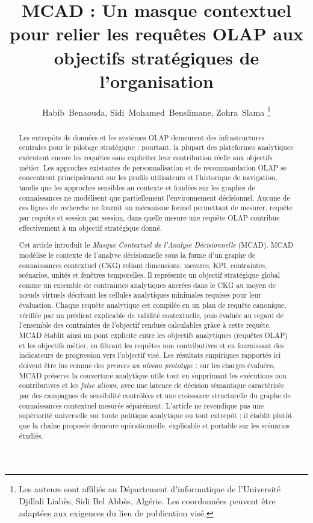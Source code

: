 \documentclass[journal]{IEEEtran}
\begin{document}
\title{MCAD : Un masque contextuel pour relier les requêtes OLAP aux objectifs stratégiques de l'organisation}

\author{Habib~Benaouda, Sidi~Mohamed~Benslimane, Zohra~Slama%
\thanks{Les auteurs sont affiliés au Département d'informatique de l'Université Djillali Liabès, Sidi Bel Abbès, Algérie. Les coordonnées peuvent être adaptées aux exigences du lieu de publication visé.}%
}

\maketitle

\begin{abstract}
Les entrepôts de données et les systèmes OLAP demeurent des infrastructures centrales pour le pilotage stratégique ; pourtant, la plupart des plateformes analytiques exécutent encore les requêtes sans expliciter leur contribution réelle aux objectifs métier. Les approches existantes de personnalisation et de recommandation OLAP se concentrent principalement sur les profils utilisateurs et l'historique de navigation, tandis que les approches sensibles au contexte et fondées sur les graphes de connaissances ne modélisent que partiellement l'environnement décisionnel. Aucune de ces lignes de recherche ne fournit un mécanisme formel permettant de mesurer, requête par requête et session par session, dans quelle mesure une requête OLAP contribue effectivement à un objectif stratégique donné.

Cet article introduit le \emph{Masque Contextuel de l'Analyse Décisionnelle} (MCAD). MCAD modélise le contexte de l'analyse décisionnelle sous la forme d'un graphe de connaissances contextuel (CKG) reliant dimensions, mesures, KPI, contraintes, scénarios, unités et fenêtres temporelles. Il représente un objectif stratégique global comme un ensemble de contraintes analytiques ancrées dans le CKG au moyen de nœuds virtuels décrivant les cellules analytiques minimales requises pour leur évaluation. Chaque requête analytique est compilée en un plan de requête canonique, vérifiée par un prédicat explicable de validité contextuelle, puis évaluée au regard de l'ensemble des contraintes de l'objectif rendues calculables grâce à cette requête. MCAD établit ainsi un pont explicite entre les objectifs analytiques (requêtes OLAP) et les objectifs métier, en filtrant les requêtes non contributives et en fournissant des indicateurs de progression vers l'objectif visé. Les résultats empiriques rapportés ici doivent être lus comme des \emph{preuves au niveau prototype} : sur les charges évaluées, MCAD préserve la couverture analytique utile tout en supprimant les exécutions non contributives et les \emph{false allows}, avec une latence de décision sémantique caractérisée par des campagnes de sensibilité contrôlées et une croissance structurelle du graphe de connaissances contextuel mesurée séparément. L'article ne revendique pas une supériorité universelle sur toute politique analytique ou tout entrepôt ; il établit plutôt que la chaîne proposée demeure opérationnelle, explicable et portable sur les scénarios étudiés.
\end{abstract}
\end{document}
